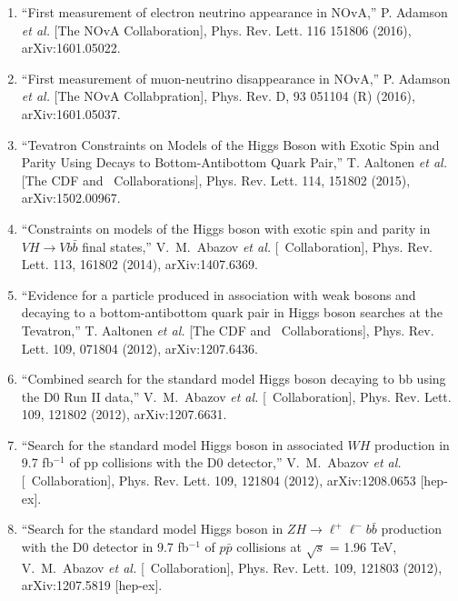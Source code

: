 \begin{enumerate}

\item ``First measurement of electron neutrino appearance in NOvA,''
P. Adamson {\it et al.} [The NOvA Collaboration],
Phys. Rev. Lett. 116 151806 (2016),
arXiv:1601.05022.

\item ``First measurement of muon-neutrino disappearance in NOvA,''
P. Adamson {\it et al.} [The NOvA Collabpration],
Phys. Rev. D, 93 051104 (R) (2016),
arXiv:1601.05037.

\item ``Tevatron Constraints 
on Models of the Higgs Boson with Exotic Spin and Parity Using Decays 
to Bottom-Antibottom Quark Pair,'' T. Aaltonen {\it et al.} 
[The CDF and \dzero\ Collaborations], 
Phys. Rev. Lett. 114, 151802 (2015),
arXiv:1502.00967.


\item ``Constraints on models of the Higgs boson with exotic spin and parity in $VH\to Vb\bar{b}$ final states,''
V.~M.~Abazov {\it et al.}  [\dzero\ Collaboration],
Phys. Rev. Lett. 113, 161802 (2014),
arXiv:1407.6369.

\item ``Evidence for a particle produced in association with weak bosons and decaying to a 
        bottom-antibottom quark pair in Higgs boson searches at the Tevatron,''
T. Aaltonen {\it et al.} [The CDF and \dzero\ Collaborations],
Phys. Rev. Lett. 109, 071804 (2012),
arXiv:1207.6436.

\item ``Combined search for the standard model Higgs boson decaying to bb using the D0 Run II data,''
V.~M.~Abazov {\it et al.}  [\dzero\ Collaboration],
Phys. Rev. Lett. 109, 121802 (2012),
arXiv:1207.6631.

\item ``Search for the standard model Higgs boson in associated $WH$ production in 9.7 fb$^{-1}$
          of pp collisions with the D0 detector,''
V.~M.~Abazov {\it et al.}  [\dzero\ Collaboration],
Phys. Rev. Lett. 109, 121804 (2012),
arXiv:1208.0653 [hep-ex].

\item ``Search for the standard model Higgs boson in $ZH\to\ell^+\ell^- b{\bar b}$ production with the D0
          detector in 9.7 fb$^{-1}$ of $p{\bar p}$ collisions at $\sqrt{s}$ = 1.96 TeV,
V.~M.~Abazov {\it et al.}  [\dzero\ Collaboration],
Phys. Rev. Lett. 109, 121803 (2012),
arXiv:1207.5819 [hep-ex].


\end{enumerate}
